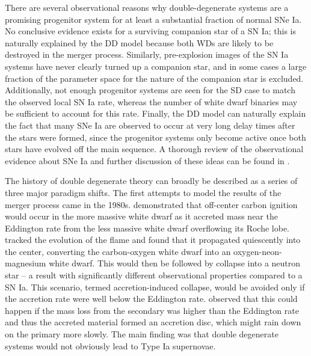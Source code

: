 \documentclass[12pt,preprint]{aastex}
\begin{document}
There are several observational reasons why double-degenerate systems are a promising progenitor system for at least a substantial fraction of normal SNe Ia. No conclusive evidence exists for a surviving companion star of a SN Ia; this is naturally explained by the DD model because both WDs are likely to be destroyed in the merger process. Similarly, pre-explosion images of the SN Ia systems have never clearly turned up a companion star, and in some cases a large fraction of the parameter space for the nature of the companion star is excluded. Additionally, not enough progenitor systems are seen for the SD case to match the observed local SN Ia rate, whereas the number of white dwarf binaries may be sufficient to account for this rate. Finally, the DD model can naturally explain the fact that many SNe Ia are observed to occur at very long delay times after the stars were formed, since the progenitor systems only become active once both stars have evolved off the main sequence. A thorough review of the observational evidence about SNe Ia and further discussion of these ideas can be found in \cite{maoz:2014}.  

The history of double degenerate theory can broadly be described as a series of three major paradigm shifts. The first attempts to model the results of the merger process came in the 1980s. \cite{nomotoiben:1985} demonstrated that off-center carbon ignition would occur in the more massive white dwarf as it accreted mass near the Eddington rate from the less massive white dwarf overflowing its Roche lobe. \cite{saionomoto:1985} tracked the evolution of the flame and found that it propagated quiescently into the center, converting the carbon-oxygen white dwarf into an oxygen-neon-magnesium white dwarf. This would then be followed by collapse into a neutron star -- a result with significantly different observational properties compared to a SN Ia. This scenario, termed accretion-induced collapse, would be avoided only if the accretion rate were well below the Eddington rate. \cite{tutukov_yungelson:1979} observed that this could happen if the mass loss from the secondary was higher than the Eddington rate and thus the accreted material formed an accretion disc, which might rain down on the primary more slowly. The main finding was that double degenerate systems would not obviously lead to Type Ia supernovae.
\end{document}
